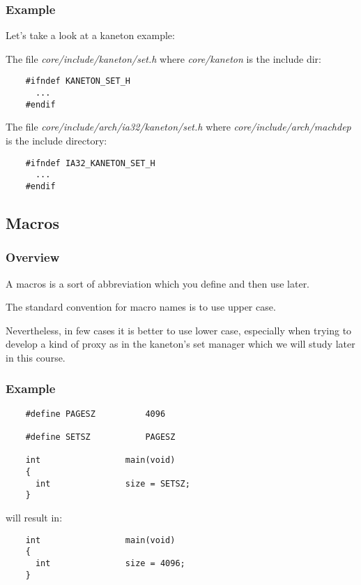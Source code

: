 \documentclass[9pt]{beamer}
\newcommand{\nl}[0]{\vspace{0.4cm}}
\begin{document}

\begin{frame}[containsverbatim]
  \frametitle{Example}

  Let's take a look at a kaneton example:

  The file \textit{core/include/kaneton/set.h} where \textit{core/kaneton}
  is the include dir:

  \begin{verbatim}
    #ifndef KANETON_SET_H
      ...
    #endif
  \end{verbatim}

  The file \textit{core/include/arch/ia32/kaneton/set.h} where
  \textit{core/include/arch/machdep} is the include directory:

  \begin{verbatim}
    #ifndef IA32_KANETON_SET_H
      ...
    #endif
  \end{verbatim}
\end{frame}

%
%

\subsection{Macros}


\begin{frame}
  \frametitle{Overview}

  A macros is a sort of abbreviation which you define and then use later.

  \nl

  The standard convention for macro names is to use upper case.

  \nl

  Nevertheless, in few cases it is better to use lower case, especially
  when trying to develop a kind of proxy as in the kaneton's set manager
  which we will study later in this course.
\end{frame}


\begin{frame}[containsverbatim]
  \frametitle{Example}

  \begin{verbatim}
    #define PAGESZ          4096

    #define SETSZ           PAGESZ

    int                 main(void)
    {
      int               size = SETSZ;
    }
  \end{verbatim}

  will result in:

  \begin{verbatim}
    int                 main(void)
    {
      int               size = 4096;
    }
  \end{verbatim}
\end{frame}
\end{document}
